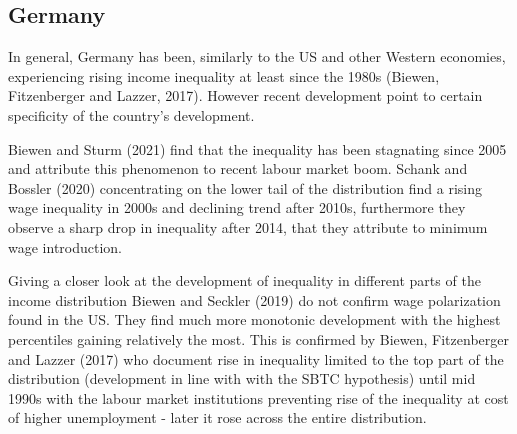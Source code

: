 \documentclass{article}
\begin{document}
\subsection{Germany}


In general, Germany has been, similarly to the US and other Western economies, experiencing rising income inequality at least since the 1980s (Biewen, Fitzenberger and Lazzer, 2017). However recent development point to certain specificity of the country's development. 

Biewen and Sturm (2021) find that the inequality has been stagnating since 2005 and attribute this phenomenon to recent labour market boom. Schank and Bossler (2020) concentrating on the lower tail of the distribution find a rising wage inequality in 2000s and declining trend after 2010s, furthermore they observe a sharp drop in inequality after 2014, that they attribute to minimum wage introduction.

Giving a closer look at the development of inequality in different parts of the income distribution Biewen and Seckler (2019) do not confirm wage polarization found in the US. They find much more monotonic development with the highest percentiles gaining relatively the most. This is confirmed by Biewen, Fitzenberger and Lazzer (2017) who document rise in inequality limited to the top part of the distribution (development in line with with the SBTC hypothesis) until mid 1990s with the labour market institutions preventing rise of the inequality at cost of higher unemployment  - later it rose across the entire distribution.
\end{document}
